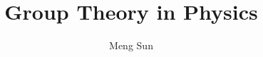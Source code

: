 \documentclass{tufte-book}
\title{Group Theory in Physics}
\author{Meng Sun}
\begin{document}
\maketitle
\tableofcontents




{}

\end{document}
